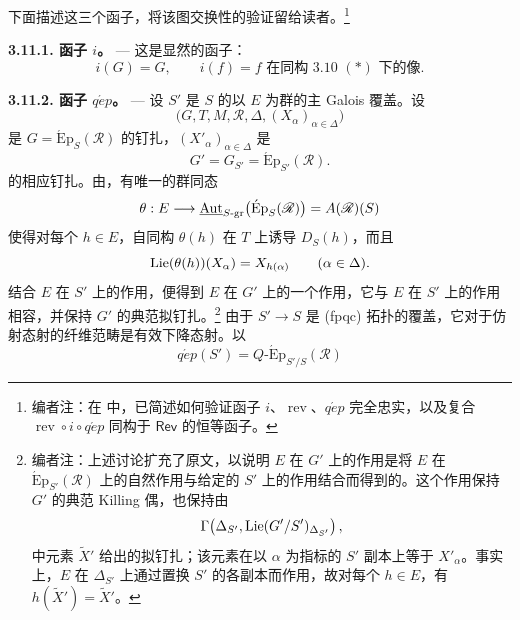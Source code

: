 下面描述这三个函子，将该图交换性的验证留给读者。\footnote{编者注：在  中，已简述如何验证函子 \(i\)、\(\operatorname{rev}\)、\(q\acute{e}p\) 完全忠实，以及复合 \(\operatorname{rev}\circ i\circ q\acute{e}p\) 同构于 \(\mathsf{Rev}\) 的恒等函子。}

\medskip\noindent\textbf{3.11.1. 函子 \(i\)。} ---
这是显然的函子：
\[
  i(G)=G,
  \qquad
  i(f)=\text{\(f\) 在同构 3.10 \((*)\) 下的像}.
\]

\medskip\noindent\textbf{3.11.2. 函子 \(q\acute{e}p\)。} ---
设 \(S'\) 是 \(S\) 的以 \(E\) 为群的主 Galois 覆盖。设
\[
  \bigl(G,T,M,\mathscr R,\Delta,
    (X_\alpha)_{\alpha\in\Delta}\bigr)
\]
是 \(G=\operatorname{\acute{E}p}_S(\mathscr R)\) 的钉扎，\((X'_\alpha)_{\alpha\in\Delta}\) 是
\[
  G'=G_{S'}=\operatorname{\acute{E}p}_{S'}(\mathscr R).
\]
的相应钉扎。由，有唯一的群同态
\[
  \theta:E
  \longrightarrow
  \underline{\operatorname{Aut}}_{S\text{-}\mathrm{gr}}
    \bigl(\operatorname{\acute{E}p}_S(\mathscr R)\bigr)
  =A(\mathscr R)(S)
\]
使得对每个 \(h\in E\)，自同构 \(\theta(h)\) 在 \(T\) 上诱导 \(D_S(h)\)，而且
\[
  \operatorname{Lie}(\theta(h))(X_\alpha)=X_{h(\alpha)}
  \qquad(\alpha\in\Delta).
\]
结合 \(E\) 在 \(S'\) 上的作用，便得到 \(E\) 在 \(G'\) 上的一个作用，它与 \(E\) 在 \(S'\) 上的作用相容，并保持 \(G'\) 的典范拟钉扎。\footnote{编者注：上述讨论扩充了原文，以说明 \(E\) 在 \(G'\) 上的作用是将 \(E\) 在 \(\operatorname{\acute{E}p}_{S'}(\mathscr R)\) 上的自然作用与给定的 \(S'\) 上的作用结合而得到的。这个作用保持 \(G'\) 的典范 Killing 偶，也保持由
\[
  \Gamma\!\left(
    \Delta_{S'},
    \operatorname{Lie}(G'/S')_{\Delta_{S'}}
  \right),
\]
中元素 \(\widetilde X'\) 给出的拟钉扎；该元素在以 \(\alpha\) 为指标的 \(S'\) 副本上等于 \(X'_\alpha\)。事实上，\(E\) 在 \(\Delta_{S'}\) 上通过置换 \(S'\) 的各副本而作用，故对每个 \(h\in E\)，有 \(h(\widetilde X')=\widetilde X'\)。}
由于 \(S'\to S\) 是 \textup{(fpqc)} 拓扑的覆盖，它对于仿射态射的纤维范畴是有效下降态射。以
\[
  q\acute{e}p(S')
  =
  Q\text{-}\operatorname{\acute{E}p}_{S'/S}(\mathscr R)
\]
